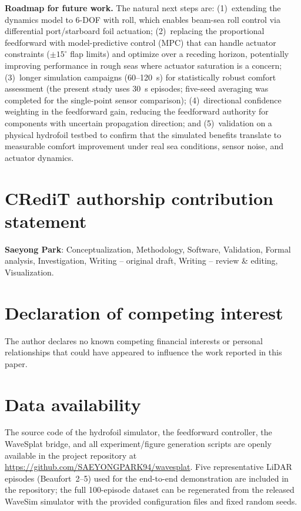 \documentclass[review]{elsarticle}
\begin{document}
\textbf{Roadmap for future work.}
The natural next steps are:
(1)~extending the dynamics model to 6-DOF with roll, which enables
    beam-sea roll control via differential port/starboard foil actuation;
(2)~replacing the proportional feedforward with model-predictive
    control (MPC) that can handle actuator constraints ($\pm 15^\circ$
    flap limits) and optimize over a receding horizon, potentially
    improving performance in rough seas where actuator saturation
    is a concern;
(3)~longer simulation campaigns (60--120~s) for statistically robust
    comfort assessment (the present study uses 30~s episodes; five-seed
    averaging was completed for the single-point sensor comparison);
(4)~directional confidence weighting in the feedforward gain,
    reducing the feedforward authority for components with uncertain
    propagation direction; and
(5)~validation on a physical hydrofoil testbed to confirm that the
    simulated benefits translate to measurable comfort improvement
    under real sea conditions, sensor noise, and actuator dynamics.

\section*{CRediT authorship contribution statement}

\textbf{Saeyong Park}: Conceptualization, Methodology, Software,
Validation, Formal analysis, Investigation, Writing -- original draft,
Writing -- review \& editing, Visualization.

\section*{Declaration of competing interest}

The author declares no known competing financial interests or
personal relationships that could have appeared to influence
the work reported in this paper.

\section*{Data availability}

The source code of the hydrofoil simulator, the feedforward controller,
the WaveSplat bridge, and all experiment/figure generation scripts
are openly available in the project repository at
\url{https://github.com/SAEYONGPARK94/wavesplat}.
Five representative LiDAR episodes (Beaufort~2--5) used for the
end-to-end demonstration are included in the repository; the full
100-episode dataset can be regenerated from the released WaveSim
simulator with the provided configuration files and fixed random seeds.
\end{document}
